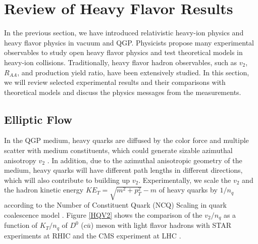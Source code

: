 \chapter{Review of Heavy Flavor Results}

In the previous section, we have introduced relativistic heavy-ion physics and heavy flavor physics in vacuum and QGP. Physicists propose many experimental observables to study open heavy flavor physics and test theoretical models in heavy-ion collisions. Traditionally, heavy flavor hadron observables, such as $v_2$, $R_{AA}$, and production yield ratio, have been extensively studied. In this section, we will review selected experimental results and their comparisons with theoretical models and discuss the physics messages from the measurements.


\section{Elliptic Flow}


In the QGP medium, heavy quarks are diffused by the color force and multiple scatter with medium constituents, which could generate sizable azimuthal anisotropy $v_2$ \cite{HQReview}. In addition, due to the azimuthal anisotropic geometry of the medium, heavy quarks will have different path lengths in different directions, which will also contribute to building up $v_2$. Experimentally, we scale the $v_2$ and the hadron kinetic energy $KE_T = \sqrt{m^2 + p_T^2} - m$ of heavy quarks by $1/n_q$ according to the Number of Constituent Quark (NCQ) Scaling in quark coalescence model \cite{NCQScaling}. Figure \ref{HQV2} shows the comparison of the $v_2/n_q$ as a function of $K_T/n_q$ of $D^0$ ($c\bar u$) meson with light flavor hadrons with STAR experiments at RHIC \cite{STARD0v2} and the CMS experiment at LHC \cite{CMSD0v2}.


